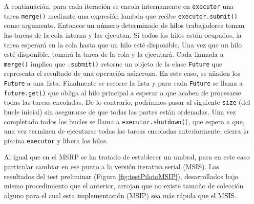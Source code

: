 \documentclass[titlepage]{article}
\begin{document}
A continuación, para cada iteración se encola internamente en \lstinline|executor| una tarea \lstinline|merge()| mediante una expresión lambda que recibe \lstinline|executor.submit()| como argumento. Entonces un número determinado de hilos trabajadores toman las tareas de la cola interna y las ejecutan. Si todos los hilos están ocupados, la tarea esperará en la cola hasta que un hilo esté disponible. Una vez que un hilo esté disponible, tomará la tarea de la cola y la ejecutará. Cada llamada a \lstinline|merge()| implica que \lstinline|.submit()| retorne un objeto de la clase \lstinline|Future| que representa el resultado de una operación asíncrona. En este caso, se añaden los \lstinline|Future| a una lista. Finalmente se recorre la lista y para cada \lstinline|Future| se llama a \lstinline|future.get()| que obliga al hilo principal a esperar a que acaben de procesarse todas las tareas encoladas. De lo contrario, podríamos pasar al siguiente \lstinline|size| (del bucle inicial) sin asegurarse de que todas las partes están ordenadas. Una vez completado todos los bucles se llama a \lstinline|executor.shutdown()|, que espera a que, una vez terminen de ejecutarse todas las tareas encoladas anteriormente, cierra la piscina \lstinline|executor| y libera los hilos.

Al igual que en el MSRP se ha tratado de establecer un umbral, para en este caso particular cambiar en ese punto a la versión iterativa serial (MSIS). Los resultados del test preliminar (Figura \ref{fig:testPilotoMSIP}), desarrollados bajo mismo procedimiento que el anterior, arrojan que no existe tamaño de colección alguno para el cual esta implementación (MSIP) sea más rápida que el MSIS.
\end{document}
